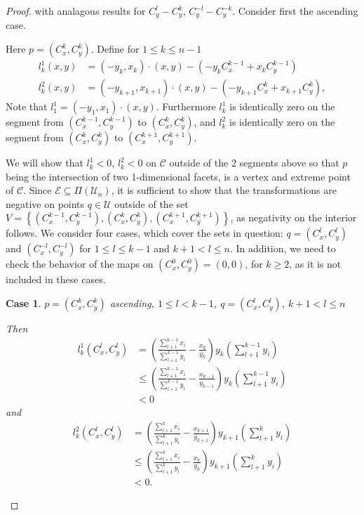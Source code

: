 \documentclass{article}
\theoremstyle{case}
\newtheorem{case}{Case}
\begin{document}
\begin{proof}
with analagous results for $C_y^l - C_y^k$, $C_y^{-l} - C_y^{-k}$.
Consider first the ascending case.


Here $p = \left( C_x^k, C_y^k \right)$.  Define for $1 \leq k \leq n-1$
\begin{align*}
l_k^1\left( x,y\right) &= \left( -y_k, x_k\right) \cdot \left( x,y\right) - \left( -y_kC_x^{k-1} + x_kC_y^{k-1}\right) \\
l_k^2\left( x,y\right) &= \left( -y_{k+1}, x_{k+1}\right) \cdot \left( x,y\right) - \left( -y_{k+1}C_x^k + x_{k+1}C_y^k\right),
\end{align*}
Note that $l_1^1 = \left( -y_1, x_1\right) \cdot \left( x,y\right)$. Furthermore $l_k^1$ is identically zero on the segment from $\left( C_x^{k-1}, C_y^{k-1}\right)$ to $\left( C_x^k, C_y^k\right)$, and $l_k^2$ is identically zero on the segment from $\left( C_x^k, C_y^k\right)$ to $\left( C_x^{k+1}, C_y^{k+1}\right)$. 

We will show that $l_k^1 < 0$, $l_k^2 < 0$ on $\mathcal{C}$ outside of the 2 segments above so that $p$ being the intersection of two 1-dimensional facets, is a vertex and extreme point of $\mathcal{C}$. Since $\mathcal{E} \subseteq \Pi\left( \mathcal{U}_n\right)$, it is sufficient to show that the transformations are negative on points $q \in \mathcal{U}$ outside of the set  $V = \left\lbrace \left( C_x^{k-1}, C_y^{k-1}\right), \left( C_x^k, C_y^k\right), \left( C_x^{k+1}, C_y^{k+1}\right)\right\rbrace$, as negativity on the interior follows. We consider four cases, which cover the sets in question: $q = (C_x^l, C_y^l)$ and $(C_x^{-l}, C_y^{-l})$ for $1 \leq l \leq k-1$ and $k+1 < l \leq n$. In addition, we need to check the behavior of the maps on $(C_x^0, C_y^0) = (0,0)$, for $k \geq 2$, as it is not included in these cases. 

%
%
\begin{case} $p = \left( C_x^k, C_y^k \right)$ ascending, $1 \leq l < k-1$, $q = \left( C_x^l, C_y^l\right)$, $k+1 < l \leq n$

\noindent Then
\begin{align*}
l_k^1\left( C_x^l, C_y^l\right) &= \left( \frac{\sum_{l+1}^{k-1} x_i}{\sum_{l+1}^{k-1} y_i} - \frac{x_k}{y_k}\right)y_k\left( \sum_{l+1}^{k-1} y_i\right) \\
&\leq \left( \frac{\sum_{l+1}^{k-1} x_i}{\sum_{l+1}^{k-1} y_i} - \frac{x_{k-1}}{y_{k-1}}\right)y_k\left( \sum_{l+1}^{k-1} y_i\right) \\
&< 0
\end{align*}
and 
\begin{align*}
l_k^2\left(C_x^l, C_y^l\right) &= \left( \frac{\sum_{l+1}^k x_i}{\sum_{l+1}^k y_i} - \frac{x_{k+1}}{y_{k+1}}\right) y_{k+1}\left(\sum_{l+1}^{k}y_i\right) \\
&\leq \left( \frac{\sum_{l+1}^k x_i}{\sum_{l+1}^k y_i} - \frac{x_k}{y_k}\right) y_{k+1}\left(\sum_{l+1}^{k}y_i\right)\\
&< 0.
\end{align*}
\end{case} 


\end{proof}
\end{document}
